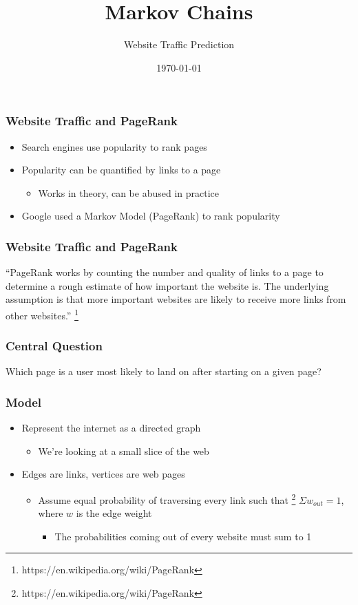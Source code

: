 \documentclass{beamer}
\title[Markov Chains]{Markov Chains}
\subtitle{Website Traffic Prediction}
\institute{Tanay Biradar}
\date{\today}
\begin{document}
\begin{frame}
  \titlepage
\end{frame}

\begin{frame}
  \frametitle{Website Traffic and PageRank}
  \begin{itemize}
    \item Search engines use popularity to rank pages
    \item Popularity can be quantified by links to a page
      \begin{itemize}
        \item Works in theory, can be abused in practice
      \end{itemize}
    \item Google used a Markov Model (PageRank) to rank popularity
  \end{itemize}
\end{frame}

\begin{frame}
  \frametitle{Website Traffic and PageRank}
  “PageRank works by counting the number and quality of links to a page to
  determine a rough estimate of how important the website is. The underlying
  assumption is that more important websites are likely to receive more links
  from other websites.”
  \footnote{https://en.wikipedia.org/wiki/PageRank}
\end{frame}

\begin{frame}
  \frametitle{Central Question}
  Which page is a user most likely to land on after starting on a given page?
\end{frame}

\begin{frame}
  \frametitle{Model}
  \begin{itemize}
    \item Represent the internet as a directed graph
        \begin{itemize}
          \item We're looking at a small slice of the web
        \end{itemize}
    \item Edges are links, vertices are web pages
        \begin{itemize}
          \item Assume equal probability of traversing every link such that
            \footnote{https://en.wikipedia.org/wiki/PageRank}
            $\Sigma w_{out} = 1$, where $w$ is the edge weight
            \begin{itemize}
              \item The probabilities coming out of every website must sum to 1
            \end{itemize}
        \end{itemize}
  \end{itemize}

\end{frame}
\end{document}

